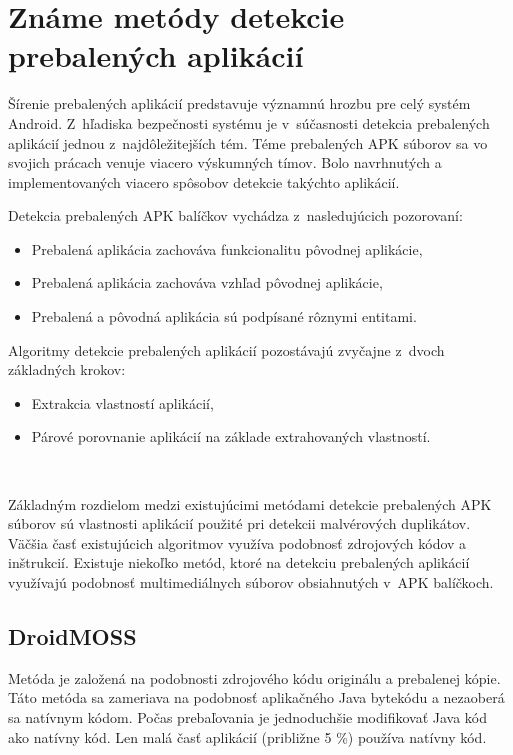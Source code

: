 \chapter{Známe metódy detekcie prebalených aplikácií}
\label{chap:zname-metody}
Šírenie prebalených aplikácií predstavuje významnú hrozbu pre celý systém Android. Z~hľadiska bezpečnosti systému je v~súčasnosti detekcia prebalených aplikácií jednou z~najdôležitejších tém.
Téme prebalených APK súborov sa vo svojich prácach venuje viacero výskumných tímov. Bolo navrhnutých a implementovaných viacero spôsobov detekcie takýchto aplikácií. 
\newline 

\noindent Detekcia prebalených APK balíčkov vychádza z~nasledujúcich pozorovaní:
\begin{itemize}
	\item Prebalená aplikácia zachováva funkcionalitu pôvodnej aplikácie,
	\item Prebalená aplikácia zachováva vzhľad pôvodnej aplikácie,
	\item Prebalená a pôvodná aplikácia sú podpísané rôznymi entitami.
\end{itemize} 

\noindent Algoritmy detekcie prebalených aplikácií pozostávajú zvyčajne z~dvoch základných krokov:
\begin{itemize}
	\item Extrakcia vlastností aplikácií,
	\item Párové porovnanie aplikácií na základe extrahovaných vlastností.
\end{itemize}
\ \newline

\noindent Základným rozdielom medzi existujúcimi metódami detekcie prebalených APK súborov sú vlastnosti aplikácií použité pri detekcii malvérových duplikátov. Väčšia časť existujúcich algoritmov využíva podobnosť zdrojových kódov a inštrukcií. Existuje niekoľko metód, ktoré na detekciu prebalených aplikácií využívajú podobnosť multimediálnych súborov obsiahnutých v~APK balíčkoch.

\section{DroidMOSS}
Metóda  je založená na podobnosti zdrojového kódu originálu a prebalenej kópie. Táto metóda sa zameriava na podobnosť aplikačného Java bytekódu a nezaoberá sa natívnym kódom. Počas prebaľovania je jednoduchšie modifikovať Java kód ako natívny kód. Len malá časť aplikácií (približne 5 \%) používa natívny kód.

